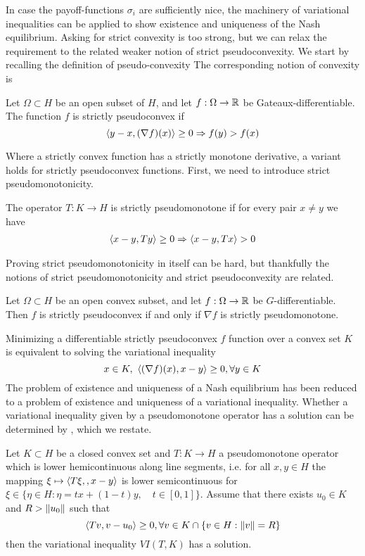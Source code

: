 In case the payoff-functions $\sigma_i$ are sufficiently nice, the machinery of variational inequalities can be applied to show existence and uniqueness of the Nash equilibrium. Asking for strict convexity is too strong, but we can relax the requirement to the related weaker notion of strict pseudoconvexity. We start by recalling the definition of pseudo-convexity
The corresponding notion of convexity is
\begin{definition}
  Let $\Omega \subset H$ be an open subset of $H$, and let $f:\Omega \to \mathbb{R}$ be Gateaux-differentiable. The function $f$ is strictly pseudoconvex if
  \begin{equation}
    \left \langle y-x,(\nabla f)(x) \right \rangle \geq 0 \Rightarrow f(y) > f(x)
  \end{equation}
\end{definition}
Where a strictly convex function has a strictly monotone derivative, a variant holds for strictly pseudoconvex functions. First, we need to introduce strict pseudomonotonicity.
\begin{definition}
 The operator $T: K \to H$ is strictly pseudomonotone if for every pair $x\neq y$ we have
 \begin{align}
   \left \langle x-y,Ty \right \rangle \geq 0 \Rightarrow \left \langle x-y,Tx \right \rangle > 0
 \end{align}
\end{definition}
Proving strict pseudomonotonicity in itself can be hard, but thankfully the notions of strict pseudomonotonicity and strict pseudoconvexity are related.
\begin{theorem}
  Let $\Omega \subset H$ be an open convex subset, and let $f:\Omega \to \mathbb{R}$ be $G$-differentiable. Then $f$ is strictly pseudoconvex if and only if $\nabla f$ is strictly pseudomonotone.
\end{theorem}
Minimizing a differentiable strictly pseudoconvex $f$ function over a convex set $K$ is equivalent to solving the variational inequality
\begin{equation}
  x \in K, ~ \left \langle (\nabla f)(x),x-y \right \rangle \geq 0, \forall y\in K
\end{equation}
The problem of existence and uniqueness of a Nash equilibrium has been reduced to a problem of existence and uniqueness of a variational inequality. Whether a variational inequality given by a pseudomonotone operator has a solution can be determined by \citep[Theorem 3.6]{maugeri2009existence}, which we restate.
\begin{theorem}
  \label{thm:existence}
  Let $K\subset H$ be a closed convex set and $T:K\to H$ a pseudomonotone operator which is lower hemicontinuous along line segments, i.e. for all $x,y\in H$ the mapping $\xi \mapsto \left \langle T\xi,,x-y \right \rangle$ is lower semicontinuous for $\xi \in \{\eta \in H : \eta = tx+(1-t)y, \quad t\in [0,1]\}$. Assume that there exists $u_0 \in K$ and $R> \left \Vert u_0 \right \Vert$ such that
  \begin{equation}
    \left \langle Tv,v-u_0 \right \rangle \geq 0, \forall v \in K \cap \{v \in H : \left \Vert v \right \Vert = R \}
  \end{equation}
  then the variational inequality $VI(T,K)$ has a solution.
\end{theorem}
